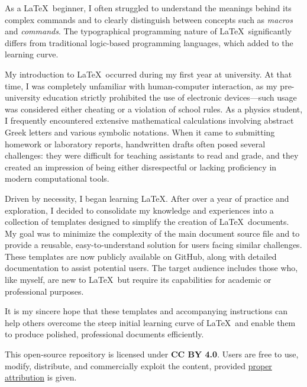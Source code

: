     As a \LaTeX\ beginner, I often struggled to understand the meanings behind its complex commands and to clearly distinguish between concepts such as \emph{macros} and \emph{commands}. The typographical programming nature of \LaTeX\ significantly differs from traditional logic-based programming languages, which added to the learning curve.

    My introduction to \LaTeX\ occurred during my first year at university. At that time, I was completely unfamiliar with human-computer interaction, as my pre-university education strictly prohibited the use of electronic devices—such usage was considered either cheating or a violation of school rules. As a physics student, I frequently encountered extensive mathematical calculations involving abstract Greek letters and various symbolic notations. When it came to submitting homework or laboratory reports, handwritten drafts often posed several challenges: they were difficult for teaching assistants to read and grade, and they created an impression of being either disrespectful or lacking proficiency in modern computational tools.

    Driven by necessity, I began learning \LaTeX. After over a year of practice and exploration, I decided to consolidate my knowledge and experiences into a collection of templates designed to simplify the creation of \LaTeX\ documents. My goal was to minimize the complexity of the main document source file and to provide a reusable, easy-to-understand solution for users facing similar challenges. These templates are now publicly available on GitHub, along with detailed documentation to assist potential users. The target audience includes those who, like myself, are new to \LaTeX\ but require its capabilities for academic or professional purposes.

    It is my sincere hope that these templates and accompanying instructions can help others overcome the steep initial learning curve of \LaTeX\ and enable them to produce polished, professional documents efficiently.
    
    This open-source repository is licensed under \textbf{CC BY 4.0}. Users are free to use, modify, distribute, and commercially exploit the content, provided \href{https://github.com/SweetPastry/spTemplate/blob/main/LICENSE}{proper attribution} is given.
